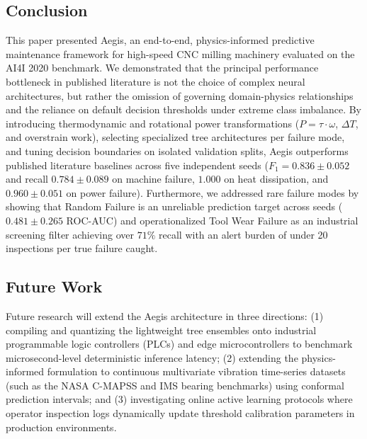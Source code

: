 \documentclass[conference]{IEEEtran}
\begin{document}
\begin{itemize}
\subsection{Conclusion}
This paper presented Aegis, an end-to-end, physics-informed predictive maintenance framework for high-speed CNC milling machinery evaluated on the AI4I 2020 benchmark. We demonstrated that the principal performance bottleneck in published literature is not the choice of complex neural architectures, but rather the omission of governing domain-physics relationships and the reliance on default decision thresholds under extreme class imbalance. By introducing thermodynamic and rotational power transformations ($P = \tau \cdot \omega$, $\Delta T$, and overstrain work), selecting specialized tree architectures per failure mode, and tuning decision boundaries on isolated validation splits, Aegis outperforms published literature baselines across five independent seeds ($F_1 = 0.836 \pm 0.052$ and recall $0.784 \pm 0.089$ on machine failure, $1.000$ on heat dissipation, and $0.960 \pm 0.051$ on power failure). Furthermore, we addressed rare failure modes by showing that Random Failure is an unreliable prediction target across seeds ($0.481 \pm 0.265$ ROC-AUC) and operationalized Tool Wear Failure as an industrial screening filter achieving over $71\%$ recall with an alert burden of under 20 inspections per true failure caught.

\subsection{Future Work}
Future research will extend the Aegis architecture in three directions: (1) compiling and quantizing the lightweight tree ensembles onto industrial programmable logic controllers (PLCs) and edge microcontrollers to benchmark microsecond-level deterministic inference latency; (2) extending the physics-informed formulation to continuous multivariate vibration time-series datasets (such as the NASA C-MAPSS and IMS bearing benchmarks) using conformal prediction intervals; and (3) investigating online active learning protocols where operator inspection logs dynamically update threshold calibration parameters in production environments.


\end{itemize}
\end{document}
